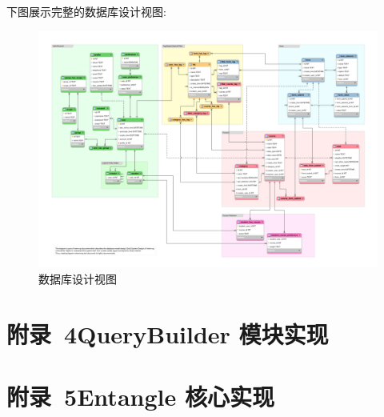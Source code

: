 下图展示完整的数据库设计视图:

\begin{figure}[!h]
  \begin{center}
    \includegraphics[angle=90, scale=0.5]{figures/eer-120dpi.png} \\
    数据库设计视图\label{FullDatabaseDesign}
  \end{center}
\end{figure}

\newpage

\section*{附录~4\quad	QueryBuilder 模块实现}



\newpage

\section*{附录~5\quad	Entangle 核心实现}



